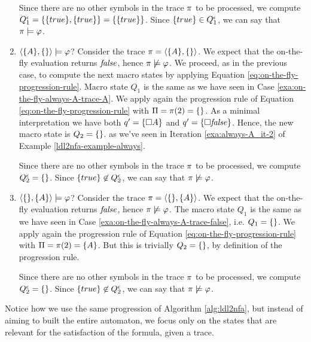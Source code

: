 \begin{example}
\begin{enumerate}
		Since there are no other symbols in the trace $\pi$ to be processed, we compute $Q_1^\epsilon = \{\{true\}, \{true\}\} = \{\{true\}\}$. Since $\{true\} \in Q_1^\epsilon$, we can say that $\pi \models \varphi$.
		
		\item $\langle \{A\}, \{\} \rangle \models \varphi$? Consider the trace $\pi = \langle \{A\}, \{\} \rangle$. We expect that the on-the-fly evaluation returns $\mathit{false}$, hence $\pi \not\models \varphi$. We proceed, as in the previous case, to compute the next macro states by applying Equation \ref{eq:on-the-fly-progression-rule}. Macro state $Q_1$ is the same as we have seen in Case \ref{exa:on-the-fly-always-A-trace-A}. 
		We apply again the progression rule of Equation \ref{eq:on-the-fly-progression-rule} with $\Pi = \pi(2) = \{\}$. 
		As a minimal interpretation we have both $q' = \{\Box A\}$ and $q' = \{\Box \mathit{false}\}$. Hence, the new macro state is $Q_2 = \{\}$. as we've seen in Iteration \ref{exa:always-A_it-2} of Example \ref{ldl2nfa-example-always}.
		
		Since there are no other symbols in the trace $\pi$ to be processed, we compute $Q_2^\epsilon = \{\}$. Since $\{true\} \not\in Q_2^\epsilon$, we can say that $\pi \not\models \varphi$.
		
		\item $\langle \{\}, \{A\} \rangle \models \varphi$? Consider the trace $\pi = \langle \{\}, \{A\} \rangle$. We expect that the on-the-fly evaluation returns $\mathit{false}$, hence $\pi \not\models \varphi$. The macro state $Q_1$ is the same as we have seen in Case \ref{exa:on-the-fly-always-A-trace-false}, i.e. $Q_1 = \{\}$. 
		We apply again the progression rule of Equation \ref{eq:on-the-fly-progression-rule} with $\Pi = \pi(2) = \{A\}$. But this is trivially $Q_2 = \{\}$, by definition of the progression rule.
		
		Since there are no other symbols in the trace $\pi$ to be processed, we compute $Q_2^\epsilon = \{\}$. Since $\{true\} \not\in Q_2^\epsilon$, we can say that $\pi \not\models \varphi$.
		
	\end{enumerate}	
	Notice how we use the same progression  of Algorithm \ref{alg:ldl2nfa}, but instead of aiming to built the entire automaton, we focus only on the states that are relevant for the satisfaction of the formula, given a trace.
	
\end{example}

